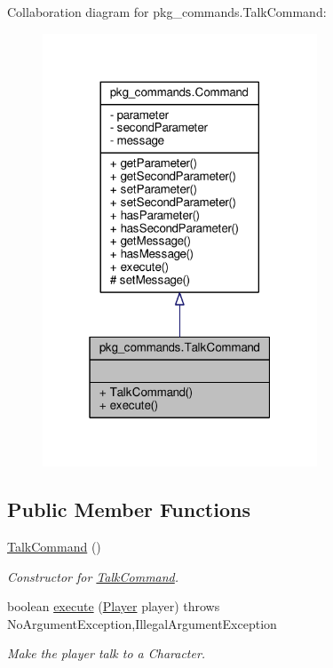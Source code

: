 Collaboration diagram for pkg\-\_\-commands.\-Talk\-Command\-:\nopagebreak
\begin{figure}[H]
\begin{center}
\leavevmode
\includegraphics[width=232pt]{classpkg__commands_1_1TalkCommand__coll__graph}
\end{center}
\end{figure}
\subsection*{Public Member Functions}
\begin{DoxyCompactItemize}
\item 
\hyperlink{classpkg__commands_1_1TalkCommand_aafa1679affe7c5622c30806837e8fb90}{Talk\-Command} ()
\begin{DoxyCompactList}\small\item\em Constructor for \hyperlink{classpkg__commands_1_1TalkCommand}{Talk\-Command}. \end{DoxyCompactList}\item 
boolean \hyperlink{classpkg__commands_1_1TalkCommand_a413573388e24a2d442f9814695f7e47c}{execute} (\hyperlink{classpkg__world_1_1Player}{Player} player)  throws No\-Argument\-Exception,\-Illegal\-Argument\-Exception 
\begin{DoxyCompactList}\small\item\em Make the player talk to a Character. \end{DoxyCompactList}\end{DoxyCompactItemize}
